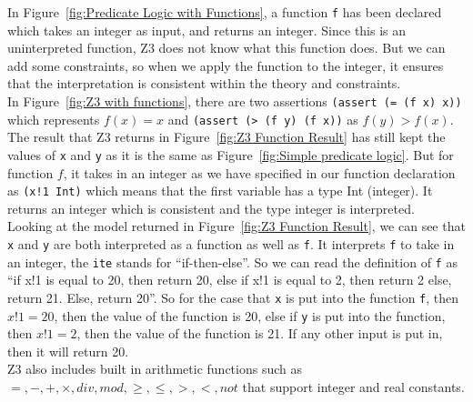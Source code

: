\documentclass[a4paper]{report}
\begin{document}
In Figure~\ref{fig:Predicate Logic with Functions}, a function \texttt{f} has been declared which takes an integer as input, and returns an integer. Since this is an uninterpreted function, Z3 does not know what this function does. But we can add some constraints, so when we apply the function to the integer, it ensures that the interpretation is consistent within the theory and constraints. \\

In Figure~\ref{fig:Z3 with functions}, there are two assertions \texttt{(assert (= (f x) x))} which represents $f(x) = x$ and \texttt{(assert (> (f y) (f x))} as $f(y) > f(x)$. The result that Z3 returns in Figure~\ref{fig:Z3 Function Result} has still kept the values of \texttt{x} and \texttt{y} as it is the same as Figure~\ref{fig:Simple predicate logic}. But for function $f$, it takes in an integer as we have specified in our function declaration as \texttt{(x!1 Int)} which means that the first variable has a type Int (integer). It returns an integer which is consistent and the type integer is interpreted. \\

Looking at the model returned in Figure~\ref{fig:Z3 Function Result}, we can see that \texttt{x} and \texttt{y} are both interpreted as a function as well as \texttt{f}. It interprets \texttt{f} to take in an integer, the \texttt{ite} stands for ``if-then-else''. So we can read the definition of \texttt{f} as “if x!1 is equal to 20, then return 20, else if x!1 is equal to 2, then return 2 else, return 21. Else, return 20”. So for the case that \texttt{x} is put into the function \texttt{f}, then $x!1 = 20$, then the value of the function is 20, else if \texttt{y} is put into the function, then $x!1 = 2$, then the value of the function is 21. If any other input is put in, then it will return 20. \\

Z3 also includes built in arithmetic functions such as $=, -, +, \times, div, mod, \geq, \leq, >, <, not$ that support integer and real constants. \\
\end{document}
